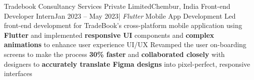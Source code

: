    \resumeSubheading
    {Tradebook Consultancy Services Private Limited}{Chembur, India}
    {Front-end Developer Intern}{Jan 2023 -- May 2023}{| \textit{Flutter}}
    \resumeItemListStart
    \resumeItem
      {Mobile App Development}
      {Led front-end development for TradeBook's cross-platform mobile application using \textbf{Flutter} and implemented \textbf{responsive UI} components and \textbf{complex animations} to enhance user experience}
    \resumeItem
      {UI/UX}
      {Revamped the user on-boarding screens to make the process \textbf{30\% faster} and \textbf{collaborated closely} with designers to \textbf{accurately translate Figma designs} into pixel-perfect, responsive interfaces}
    \resumeItemListEnd